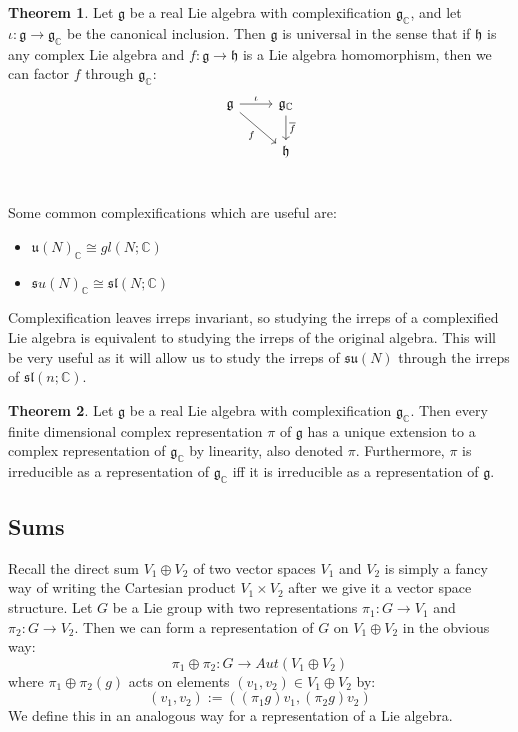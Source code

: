 \documentclass[11pt, oneside]{article}   	%
\theoremstyle{definition}
\newtheorem{theorem}{Theorem}[section]
\begin{document}
\begin{theorem}
	Let $\mathfrak g$ be a real Lie algebra with complexification $\mathfrak g_\mathbb{C}$, and let $\iota : \mathfrak 
	g\rightarrow\mathfrak g_\mathbb{C}$ be the canonical inclusion. Then $\mathfrak g$ is universal in the sense that if 
	$\mathfrak h$ is any complex Lie algebra and $f : \mathfrak g\rightarrow\mathfrak h$ is a Lie algebra homomorphism, 
	then we can factor $f$ through $\mathfrak g_\mathbb{C}$:
	\[\begin{tikzcd}
		\mathfrak g\arrow[r, "\iota"]\arrow[dr, swap, "f"] & \mathfrak g_\mathbb{C}\arrow[d, "\overline{f}"] \\
		& \mathfrak h \\
	\end{tikzcd}\]
\end{theorem}
Some common complexifications which are useful are:
\begin{itemize}
	\item $\mathfrak u(N)_\mathbb{C}\cong gl(N; \mathbb C)$
	\item $\mathfrak su(N)_\mathbb{C}\cong \mathfrak{sl}(N; \mathbb C)$
\end{itemize}

Complexification leaves irreps invariant, so studying the irreps of a complexified Lie algebra is equivalent to studying the 
irreps of the original algebra. This will be very useful as it will allow us to study the irreps of $\mathfrak{su}(N)$ through the 
irreps of $\mathfrak{sl}(n; \mathbb C)$. 

\begin{theorem}
	Let $\mathfrak g$ be a real Lie algebra with complexification $\mathfrak g_\mathbb{C}$. Then every finite dimensional 
	complex representation $\pi$ of $\mathfrak g$ has a unique extension to a complex representation of 
	$\mathfrak g_{\mathbb C}$ by linearity, also denoted $\pi$. Furthermore, $\pi$ is irreducible as a representation of 
	$\mathfrak g_{\mathbb C}$ iff it is irreducible as a representation of $\mathfrak g$. 
\end{theorem}

\subsection{Sums}

Recall the direct sum $V_1\oplus V_2$ of two vector spaces $V_1$ and $V_2$ is simply a fancy way of writing 
the Cartesian product $V_1\times V_2$ after we give it a vector space structure. 
Let $G$ be a Lie group with two representations $\pi_1 : G\rightarrow V_1$ and $\pi_2 : G\rightarrow V_2$. 
Then we can form a representation of $G$ on $V_1\oplus V_2$ in the obvious way:
\begin{equation}
	\pi_1\oplus\pi_2 : G\rightarrow Aut(V_1\oplus V_2)
\end{equation}
where $\pi_1\oplus\pi_2(g)$ acts on elements $(v_1, v_2)\in V_1\oplus V_2$ by:
\begin{equation}
	[(\pi_1\oplus \pi_2)g] (v_1, v_2) := ((\pi_1g)v_1, (\pi_2g)v_2)
\end{equation}
We define this in an analogous way for a representation of a Lie algebra. 
\end{document}
